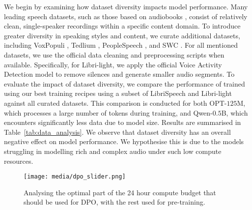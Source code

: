  We begin by examining how dataset diversity impacts model performance. Many leading speech datasets, such as those based on audiobooks \citep{ls, ll}, consist of relatively clean, single-speaker recordings within a specific content domain. To introduce greater diversity in speaking styles and content, we curate additional datasets, including VoxPopuli \cite{vp}, Tedlium \cite{tedlium}, PeopleSpeech \cite{people}, and SWC \cite{swc}. For all mentioned datasets, we use the official data cleaning and preprocessing scripts when available. Specifically, for Libri-light, we apply the official Voice Activity Detection model to remove silences and generate smaller audio segments. To evaluate the impact of dataset diversity, we compare the performance of \slms trained using our best training recipes using a subset of LibriSpeech and Libri-light against all curated datasets. This comparison is conducted for both OPT-$125$M, which processes a large number of tokens during training, and Qwen-$0.5$B, which encounters significantly less data due to model size. Results are summarised in Table~\ref{tab:data_analysis}. We observe that dataset diversity has an overall negative effect on model performance. We hypothesise this is due to the models struggling in modelling rich and complex audio under such low compute resources.

\begin{figure}[t!]
  \centering
  \texttt{[image: media/dpo\_slider.png]}
  \caption{Analysing the optimal part of the 24 hour compute budget that should be used for DPO, with the rest used for pre-training.\label{fig:dpo}}  
\end{figure}

